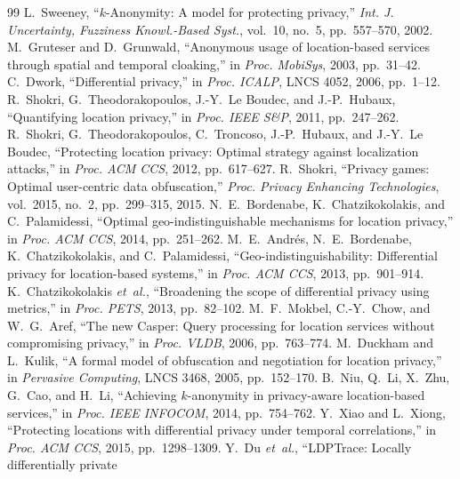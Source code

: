 \documentclass[11pt]{article}
\begin{document}
\begin{thebibliography}{99}
 L.~Sweeney, ``$k$-Anonymity: A model for protecting
privacy,'' \emph{Int. J. Uncertainty, Fuzziness Knowl.-Based Syst.}, vol.~10,
no.~5, pp.~557--570, 2002.
 M.~Gruteser and D.~Grunwald, ``Anonymous usage of
location-based services through spatial and temporal cloaking,'' in \emph{Proc.
MobiSys}, 2003, pp.~31--42.
 C.~Dwork, ``Differential privacy,'' in \emph{Proc. ICALP},
LNCS 4052, 2006, pp.~1--12.
 R.~Shokri, G.~Theodorakopoulos, J.-Y.~Le Boudec, and
J.-P.~Hubaux, ``Quantifying location privacy,'' in \emph{Proc. IEEE S\&P}, 2011,
pp.~247--262.
 R.~Shokri, G.~Theodorakopoulos, C.~Troncoso, J.-P.~Hubaux,
and J.-Y.~Le Boudec, ``Protecting location privacy: Optimal strategy against
localization attacks,'' in \emph{Proc. ACM CCS}, 2012, pp.~617--627.
 R.~Shokri, ``Privacy games: Optimal user-centric data
obfuscation,'' \emph{Proc. Privacy Enhancing Technologies}, vol.~2015, no.~2,
pp.~299--315, 2015.
 N.~E.~Bordenabe, K.~Chatzikokolakis, and C.~Palamidessi,
``Optimal geo-indistinguishable mechanisms for location privacy,'' in \emph{Proc.
ACM CCS}, 2014, pp.~251--262.
 M.~E.~Andr\'{e}s, N.~E.~Bordenabe, K.~Chatzikokolakis, and
C.~Palamidessi, ``Geo-indistinguishability: Differential privacy for
location-based systems,'' in \emph{Proc. ACM CCS}, 2013, pp.~901--914.
 K.~Chatzikokolakis \emph{et~al.}, ``Broadening the
scope of differential privacy using metrics,'' in \emph{Proc. PETS}, 2013,
pp.~82--102.
 M.~F.~Mokbel, C.-Y.~Chow, and W.~G.~Aref, ``The new Casper:
Query processing for location services without compromising privacy,'' in
\emph{Proc. VLDB}, 2006, pp.~763--774.
 M.~Duckham and L.~Kulik, ``A formal model of obfuscation and
negotiation for location privacy,'' in \emph{Pervasive Computing}, LNCS 3468,
2005, pp.~152--170.
 B.~Niu, Q.~Li, X.~Zhu, G.~Cao, and H.~Li, ``Achieving
$k$-anonymity in privacy-aware location-based services,'' in \emph{Proc. IEEE
INFOCOM}, 2014, pp.~754--762.
 Y.~Xiao and L.~Xiong, ``Protecting locations with differential
privacy under temporal correlations,'' in \emph{Proc. ACM CCS}, 2015,
pp.~1298--1309.
 Y.~Du \emph{et~al.}, ``LDPTrace: Locally differentially private

\end{thebibliography}
\end{document}
